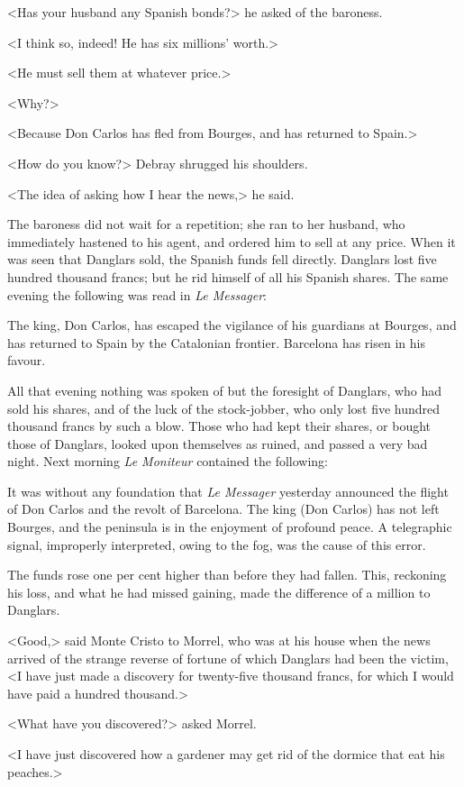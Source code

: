  <Has your husband any Spanish bonds?> he asked of the baroness. 

 <I think so, indeed! He has six millions' worth.> 

 <He must sell them at whatever price.> 

 <Why?> 

 <Because Don Carlos has fled from Bourges, and has returned to Spain.>

<How do you know?> Debray shrugged his shoulders. 

 <The idea of asking how I hear the news,> he said. 

 The baroness did not wait for a repetition; she ran to her husband, who immediately hastened to his agent, and ordered him to sell at any price. When it was seen that Danglars sold, the Spanish funds fell directly. Danglars lost five hundred thousand francs; but he rid himself of all his Spanish shares. The same evening the following was read in \textit{Le Messager}: 

\begin{newspaper}[By telegraph.]{} 
The king, Don Carlos, has escaped the vigilance of his guardians at Bourges, and has returned to Spain by the Catalonian frontier. Barcelona has risen in his favour.
\end{newspaper}

 All that evening nothing was spoken of but the foresight of Danglars, who had sold his shares, and of the luck of the stock-jobber, who only lost five hundred thousand francs by such a blow. Those who had kept their shares, or bought those of Danglars, looked upon themselves as ruined, and passed a very bad night. Next morning \textit{Le Moniteur} contained the following: 

\begin{newspaper}{}
It was without any foundation that \textit{Le Messager} yesterday announced the flight of Don Carlos and the revolt of Barcelona. The king (Don Carlos) has not left Bourges, and the peninsula is in the enjoyment of profound peace. A telegraphic signal, improperly interpreted, owing to the fog, was the cause of this error.
\end{newspaper}

 The funds rose one per cent higher than before they had fallen. This, reckoning his loss, and what he had missed gaining, made the difference of a million to Danglars. 

 <Good,> said Monte Cristo to Morrel, who was at his house when the news arrived of the strange reverse of fortune of which Danglars had been the victim, <I have just made a discovery for twenty-five thousand francs, for which I would have paid a hundred thousand.> 

 <What have you discovered?> asked Morrel. 

 <I have just discovered how a gardener may get rid of the dormice that eat his peaches.> 